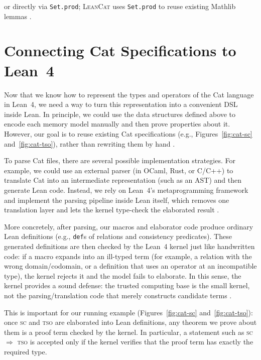 or directly via \texttt{Set.prod}; \textsc{LeanCat} uses \texttt{Set.prod} to reuse existing Mathlib lemmas \citep{mathlib2020}.


\section{Connecting Cat Specifications to Lean~4}
Now that we know how to represent the types and operators of the Cat language in Lean~4, we need a way to turn this representation into a convenient DSL inside Lean. In principle, we could use the data structures defined above to encode each memory model manually and then prove properties about it. However, our goal is to reuse existing Cat specifications (e.g., Figures~\ref{fig:cat-sc} and~\ref{fig:cat-tso}), rather than rewriting them by hand \citep{catOnlineDocHerd,catManualSyntax11}.

To parse Cat files, there are several possible implementation strategies. For example, we could use an external parser (in OCaml, Rust, or C/C++) to translate Cat into an intermediate representation (such as an AST) and then generate Lean code. Instead, we rely on Lean~4's metaprogramming framework and implement the parsing pipeline inside Lean itself, which removes one translation layer and lets the kernel type-check the elaborated result \citep{10.1145/3110278Lean4Meta,deMoura2021lean4}.

More concretely, after parsing, our macros and elaborator code produce ordinary Lean definitions (e.g., \texttt{def}s of relations and consistency predicates). These generated definitions are then checked by the Lean~4 kernel just like handwritten code: if a macro expands into an ill-typed term (for example, a relation with the wrong domain/codomain, or a definition that uses an operator at an incompatible type), the kernel rejects it and the model fails to elaborate. In this sense, the kernel provides a sound defense: the trusted computing base is the small kernel, not the parsing/translation code that merely constructs candidate terms \citep{10.1145/3110278Lean4Meta,deMoura2021lean4}.

This is important for our running example (Figures~\ref{fig:cat-sc} and~\ref{fig:cat-tso}): once \textsc{sc} and \textsc{tso} are elaborated into Lean definitions, any theorem we prove about them is a proof term checked by the kernel. In particular, a statement such as \textsc{sc} $\Rightarrow$ \textsc{tso} is accepted only if the kernel verifies that the proof term has exactly the required type.

